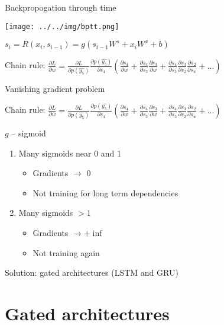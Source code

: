 \documentclass[usenames,dvipsnames,handout,aspectratio=169]{beamer}
\begin{document}
\begin{frame}{Backpropogation through time}	
\begin{center}
\texttt{[image: ../../img/bptt.png]}

\end{center}





$s_i = R(x_i, s_{i-1}) =g(s_{i-1}  W^s + x_i W^x + b)$

Chain rule: $ \frac{\partial L}{\partial w} = \frac{\partial L}{\partial p(\hat{y_5})} \frac{\partial p(\hat{y_5})}{\partial s_4} (\frac{ \partial s_4 }{\partial w}  + \frac{ \partial s_4 }{\partial s_3} \frac{ \partial s_3 }{\partial w} + \frac{ \partial s_4 }{\partial s_3} \frac{ \partial s_3 }{\partial s_2} \frac{ \partial s_2 }{\partial s_w} + \ldots ) $




\end{frame}

\begin{frame}{Vanishing gradient problem}	


Chain rule: $ \frac{\partial L}{\partial w} = \frac{\partial L}{\partial p(\hat{y_5})} \frac{\partial p(\hat{y_5})}{\partial s_4} (\frac{ \partial s_4 }{\partial w}  + \frac{ \partial s_4 }{\partial s_3} \frac{ \partial s_3 }{\partial w} + \frac{ \partial s_4 }{\partial s_3} \frac{ \partial s_3 }{\partial s_2} \frac{ \partial s_2 }{\partial s_w} + \ldots ) $

$g$ – sigmoid

\begin{enumerate}
	\item Many sigmoids near 0 and 1
	\begin{itemize}
		\item Gradients $\rightarrow$ 0
		\item Not training for long term dependencies
	\end{itemize}
	\item Many sigmoids $>1$
	\begin{itemize}
		\item Gradients $\rightarrow +\inf$ 
		\item Not training again
	\end{itemize}
\end{enumerate}
Solution: gated architectures (LSTM and GRU)

\end{frame}

\section{Gated architectures}
\end{document}
